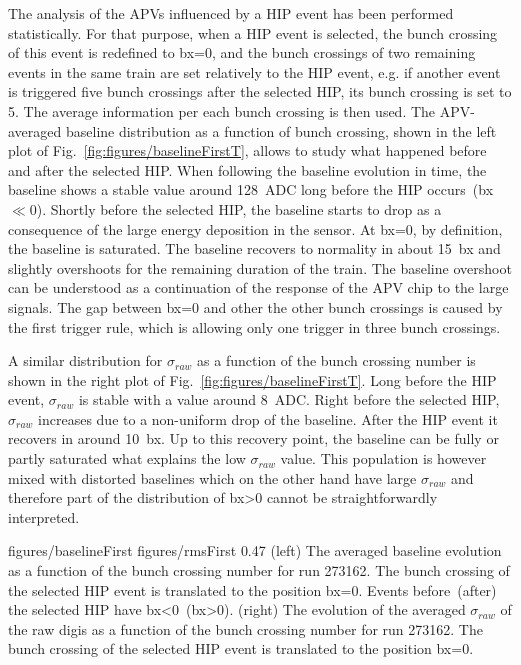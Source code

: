 The analysis of the APVs influenced by a HIP event has been performed statistically. For that purpose, when a HIP event is selected, the bunch crossing of this event is redefined to bx=0, and the bunch crossings of two remaining events in the same train are set relatively to the HIP event, e.g. if another event is triggered five bunch crossings after the selected HIP, its bunch crossing is set to 5. The average information per each bunch crossing is then used. The APV-averaged baseline distribution as a function of bunch crossing, shown in the left plot of Fig.~\ref{fig:figures/baselineFirstT}, allows to study what happened before and after the selected HIP. When following the baseline evolution in time, the baseline shows a stable value around 128~ADC long before the HIP occurs~(bx$\ll$0). Shortly before the selected HIP, the baseline starts to drop as a consequence of the large energy deposition in the sensor. At bx=0, by definition, the baseline is saturated. The baseline recovers to normality in about 15~bx and slightly overshoots for the remaining duration of the train. The baseline overshoot can be understood as a continuation of the response of the APV chip to the large signals. The gap between bx=0 and other the other bunch crossings is caused by the first trigger rule, which is allowing only one trigger in three bunch crossings. 

A similar distribution for $\sigma_{raw}$  as a function of the bunch crossing number is shown in the right plot of Fig.~\ref{fig:figures/baselineFirstT}. Long before the HIP event, $\sigma_{raw}$ is stable with a value around 8~ADC. Right before the selected HIP, $\sigma_{raw}$ increases due to a non-uniform drop of the baseline. After the HIP event it recovers in around 10~bx. Up to this recovery point, the baseline can be fully or partly saturated what explains the low $\sigma_{raw}$ value. This population is however mixed with distorted baselines which on the other hand have large $\sigma_{raw}$ and therefore part of the distribution of bx>0 cannot be straightforwardly interpreted.

                 {figures/baselineFirst} %
                 {figures/rmsFirst} %
                 {0.47}       %
                 {(left) The averaged baseline evolution as a function of the bunch crossing number for run 273162. The bunch crossing of the selected HIP event is translated to the position bx=0. Events before~(after) the selected HIP have bx<0~(bx>0). (right) The evolution of the averaged $\sigma_{raw}$ of the raw digis as a function of the bunch crossing number for run 273162. The bunch crossing of the selected HIP event is translated to the position bx=0. } %

